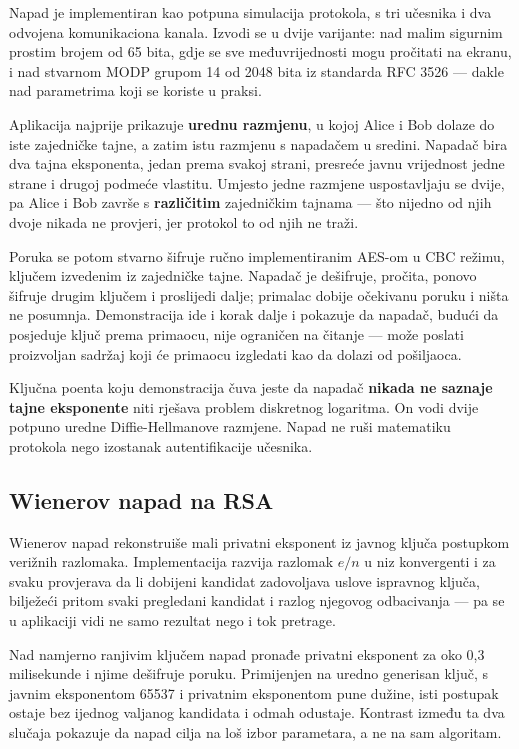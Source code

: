 Napad je implementiran kao potpuna simulacija protokola, s tri učesnika i dva odvojena komunikaciona kanala. Izvodi se u dvije varijante: nad malim sigurnim prostim brojem od 65 bita, gdje se sve međuvrijednosti mogu pročitati na ekranu, i nad stvarnom MODP grupom 14 od 2048 bita iz standarda RFC 3526 --- dakle nad parametrima koji se koriste u praksi.

Aplikacija najprije prikazuje \textbf{urednu razmjenu}, u kojoj Alice i Bob dolaze do iste zajedničke tajne, a zatim istu razmjenu s napadačem u sredini. Napadač bira dva tajna eksponenta, jedan prema svakoj strani, presreće javnu vrijednost jedne strane i drugoj podmeće vlastitu. Umjesto jedne razmjene uspostavljaju se dvije, pa Alice i Bob završe s \textbf{različitim} zajedničkim tajnama --- što nijedno od njih dvoje nikada ne provjeri, jer protokol to od njih ne traži.

Poruka se potom stvarno šifruje ručno implementiranim AES-om u CBC režimu, ključem izvedenim iz zajedničke tajne. Napadač je dešifruje, pročita, ponovo šifruje drugim ključem i proslijedi dalje; primalac dobije očekivanu poruku i ništa ne posumnja. Demonstracija ide i korak dalje i pokazuje da napadač, budući da posjeduje ključ prema primaocu, nije ograničen na čitanje --- može poslati proizvoljan sadržaj koji će primaocu izgledati kao da dolazi od pošiljaoca.

Ključna poenta koju demonstracija čuva jeste da napadač \textbf{nikada ne saznaje tajne eksponente} niti rješava problem diskretnog logaritma. On vodi dvije potpuno uredne Diffie-Hellmanove razmjene. Napad ne ruši matematiku protokola nego izostanak autentifikacije učesnika.

\subsection{Wienerov napad na RSA}
\label{subsec:wiener}

Wienerov napad rekonstruiše mali privatni eksponent iz javnog ključa postupkom verižnih razlomaka. Implementacija razvija razlomak $e/n$ u niz konvergenti i za svaku provjerava da li dobijeni kandidat zadovoljava uslove ispravnog ključa, bilježeći pritom svaki pregledani kandidat i razlog njegovog odbacivanja --- pa se u aplikaciji vidi ne samo rezultat nego i tok pretrage.

Nad namjerno ranjivim ključem napad pronađe privatni eksponent za oko 0,3 milisekunde i njime dešifruje poruku. Primijenjen na uredno generisan ključ, s javnim eksponentom 65537 i privatnim eksponentom pune dužine, isti postupak ostaje bez ijednog valjanog kandidata i odmah odustaje. Kontrast između ta dva slučaja pokazuje da napad cilja na loš izbor parametara, a ne na sam algoritam.

